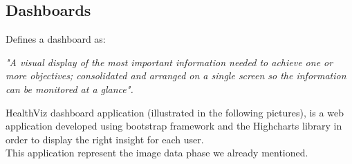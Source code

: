 \newpage
\subsection{Dashboards}
\cite{hynekAutomaticEvaluationInformation2015} Defines a dashboard as:
\begin{displayquote}
  \emph{"A visual display of the most important information needed to achieve one or more objectives; consolidated and arranged on a single screen so the information can be monitored at a glance".} \end{displayquote}

HealthViz dashboard application (illustrated in the following pictures), is a web application developed using bootstrap\cite{IntroductionBootstrapV5}  framework and the Highcharts  library in order to display the right insight for each user.\\
This application represent the image data phase we already mentioned. 


